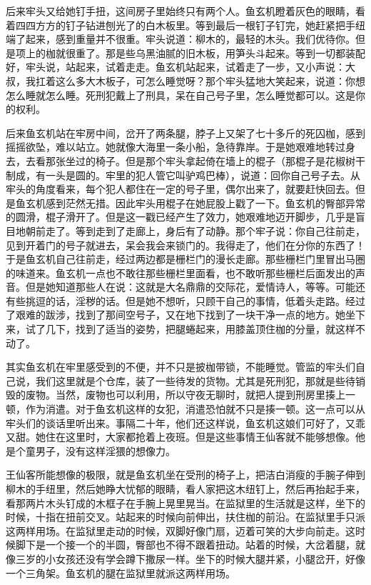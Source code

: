 后来牢头又给她钉手扭，这间房子里始终只有两个人。鱼玄机瞪着灰色的眼睛，看着四四方方的钉子钻进刨光了的白木板里。等到最后一根钉子钉完，她赶紧把手纽端了起来，感到重量并不很重。牢头说道：柳木的，最轻的木头。我们优待你。但是项上的枷就很重了。那是些乌黑油腻的旧木板，用笋头斗起来。等到一切都装配好，牢头说，站起来，试着走走。鱼玄机站起来，试着走了一步，又小声说：大叔，我扛着这么多大木板子，可怎么睡觉呀？那个牢头猛地大笑起来，说道：你想怎么睡就怎么睡。死刑犯戴上了刑具，呆在自己号子里，怎么睡觉都可以。这是你的权利。 

后来鱼玄机站在牢房中间，岔开了两条腿，脖子上又架了七十多斤的死囚枷，感到摇摇欲坠，难以站立。她就像大海里一条小船，急待靠岸。于是她艰难地转过身去，去看那张坐过的椅子。但是那个牢头拿起倚在墙上的棍子（那棍子是花椒树干制成，有一头是圆的。牢里的犯人管它叫驴鸡巴棒），说道：回你自己号子去。从牢头的角度看来，每个犯人都住在一定的号子里，偶尔出来了，就要赶快回去。但是鱼玄机感到茫然无措。因此牢头用棍子在她屁股上戳了一下。鱼玄机的臀部异常的圆滑，棍子滑开了。但是这一戳已经产生了效力，她艰难地迈开脚步，几乎是盲目地朝前走了。等到走到了走廊上，身后有了动静。那个牢子说：你自己往前走，见到开着门的号子就进去，呆会我会来锁门的。我得走了，他们在分你的东西了！于是鱼玄机自己往前走，经过两边都是栅栏门的漫长走廊。那些栅栏门里冒出马圈的味道来。鱼玄机一点也不敢往那些栅栏里面看，也不敢听那些栅栏后面发出的声音。但是她知道那些人在说：这就是大名鼎鼎的交际花，爱情诗人，等等。可能还有些挑逗的话，淫秽的话。但是她不想听，只顾干自己的事情，低着头走路。经过了艰难的跋涉，找到了那间空号子，又在地下找到了一块干净一点的地方。她坐下来，试了几下，找到了适当的姿势，把腿蜷起来，用膝盖顶住枷的分量，就这样不动了。 

其实鱼玄机在牢里感受到的不便，并不只是披枷带锁，不能睡觉。管监的牢头们自己说，我们这里就是个仓库，装了一些待发的货物。尤其是死刑犯，那就是些待销毁的废物。当然，废物也可以利用，所以守夜无聊时，就把人提到刑房里揍上一顿，作为消遣。对于鱼玄机这样的女犯，消遣恐怕就不只是揍一顿。这一点可以从牢头们的谈话里听出来。事隔二十年，他们还这样说，鱼玄机这娘们可好了，又乖又甜。她住在这里时，大家都抢着上夜班。但是这些事情王仙客就不能够想像。他是个童男子，没有这样淫猥的想像力。 

王仙客所能想像的极限，就是鱼玄机坐在受刑的椅子上，把洁白消瘦的手腕子伸到柳木的手纽里，然后她睁大忧郁的眼睛，看人家把这木纽钉上，然后再抬起手来，看那两片木头钉成的木框子在手腕上晃里晃当。在监狱里的生活就是这样，坐下的时候，十指在扭前交叉。站起来的时候向前伸出，扶住枷的前沿。在监狱里手只派这两样用场。在监狱里走动的时候，双脚好像门扇，迈着可笑的大步向前走。这时候脚下是一个接一个的半圆，臀部也不得不跟着扭动。站着的时候，大岔着腿，就像三岁的小女孩还没有学会蹲下撒尿一样。坐下的时候大腿并紧，小腿岔开，好像一个三角架。鱼玄机的腿在监狱里就派这两样用场。 

